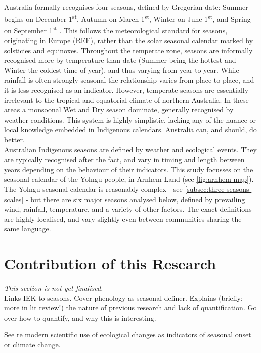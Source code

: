 Australia formally recognises four seasons, defined by Gregorian date:
Summer begins on December 1\textsuperscript{st}, Autumn on March
1\textsuperscript{st}, Winter on June 1\textsuperscript{st}, and Spring
on September 1\textsuperscript{st} \citep{wells2013}. This follows the
meteorological standard for seasons, originating in Europe (REF), rather
than the solar seasonal calendar marked by solsticies and equinoxes.
%
Throughout the temperate zone, seasons are informally recognised more by
temperature than date (Summer being the hottest and Winter the coldest time
of year), and thus varying from year to year.  While rainfall is often
strongly  seasonal the relationship varies from place to place, and it is
less recognised as an indicator.
%
However, temperate seasons are essentially irrelevant to the tropical and
equatorial climate of northern Australia.  In these areas a monsoonal Wet
and Dry season dominate, generally recognised by weather conditions.
This system is highly simplistic, lacking any of the nuance or local
knowledge embedded in Indigenous calendars.  Australia can, and should,
do better.\\


Australian Indigenous seasons are defined by weather and ecological events.
They are typically recognised after the fact, and vary in timing and length
between years depending on the behaviour of their indicators.  This study
focusses on the seasonal calendar of the Yolngu people, in Arnhem Land (see
\autoref{fig:arnhem-map}).
%
The Yolngu seasonal calendar is reasonably complex - see
\autoref{subsec:three-seasons-scales} - but there are six major seasons
analysed below, defined by prevailing wind, rainfall, temperature, and a
variety of other factors.  The exact definitions are highly localised,
and vary slightly even between communities sharing the same language.




\section{Contribution of this Research}
\label{sec:intro-contribution}
\textit{This section is not yet finalised.}\\

Links IEK to seasons.  Cover phenology as seasonal definer.
Explains (briefly; more in lit review!) the nature of previous research
and lack of quantification.  Go over how to quantify, and why
this is interesting.


See \citet{menzel2006} re modern scientific use of ecological changes
as indicators of seasonal onset or climate change.


